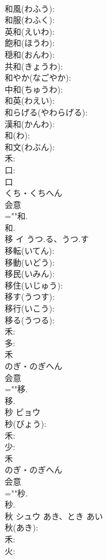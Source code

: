 \documentclass[8pt]{extreport}
\begin{document}
\begin{CJK}{UTF8}{min}
\\	和風(わふう): 
\\	和服(わふく): 
\\	英和(えいわ): 
\\	飽和(ほうわ): 
\\	穏和(おんわ): 
\\	共和(きょうわ): 
\\	和やか(なごやか): 
\\	中和(ちゅうわ): 
\\	和英(わえい): 
\\	和らげる(やわらげる): 
\\	漢和(かんわ): 
\\	和(わ): 
\\	和文(わぶん): 
\\	禾: 
\\	口: 
\\	口	
\\	くち・くちへん	
\\	会意 
\\	=""和.
\\	和.
\\	移	イ	うつ.る、うつ.す		
\\	移転(いてん): 
\\	移動(いどう): 
\\	移民(いみん): 
\\	移住(いじゅう): 
\\	移す(うつす): 
\\	移行(いこう): 
\\	移る(うつる): 
\\	禾: 
\\	多: 
\\	禾	
\\	のぎ・のぎへん	
\\	会意 
\\	=""移.
\\	移.
\\	秒	ビョウ			
\\	秒(びょう): 
\\	禾: 
\\	少: 
\\	禾	
\\	のぎ・のぎへん	
\\	会意 
\\	=""秒.
\\	秒.
\\	秋	シュウ	あき、とき	あい	
\\	秋(あき): 
\\	禾: 
\\	火: 

\end{CJK}
\end{document}
